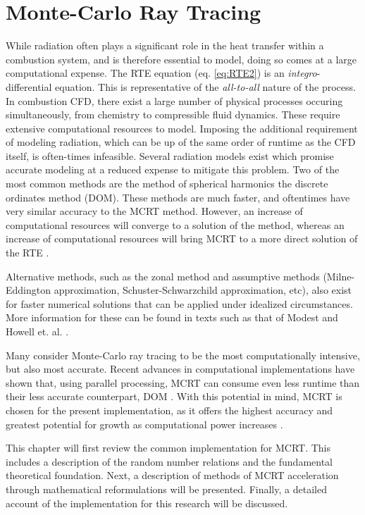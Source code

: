 \addchapheadtotoc
\chapter{Monte-Carlo Ray Tracing}\label{chapter:Modeling}
While radiation often plays a significant role in the heat transfer within a combustion system, and is therefore essential to model, doing so comes at a large computational expense. 
The RTE equation (eq. \ref{eq:RTE2}) is an \textit{integro}-differential equation. This is representative of the \textit{all-to-all} nature of the process. In combustion CFD, there exist a large number of physical processes occuring simultaneously, from chemistry to compressible fluid dynamics. 
These require extensive computational resources to model. Imposing the additional requirement of modeling radiation, which can be up of the same order of runtime as the CFD itself, is often-times infeasible. 
Several radiation models exist which promise accurate modeling at a reduced expense to mitigate this problem. Two of the most common methods are the method of spherical harmonics the discrete ordinates method (DOM).
These methods are much faster, and oftentimes have very similar accuracy to the MCRT method. However, an increase of computational resources will converge to a solution of the method, whereas an increase of computational resources will bring MCRT to a more direct solution of the RTE \cite{Leccese2018ConvectiveChambers}.

Alternative methods, such as the zonal method and assumptive methods (Milne-Eddington approximation, Schuster-Schwarzchild approximation, etc), also exist for faster numerical solutions that can be applied under idealized circumstances.
More information for these can be found in texts such as that of Modest \cite{Modest2013RadiativeTransfer} and Howell et. al. \cite{Howell2010ThermalTransfer}.

Many consider Monte-Carlo ray tracing to be the most computationally intensive, but also most accurate.
Recent advances in computational implementations have shown that, using parallel processing, MCRT can consume even less runtime than their less accurate counterpart, DOM \cite{Humphrey2016RadiativeRefinement}.
With this potential in mind, MCRT is chosen for the present implementation, as it offers the highest accuracy and greatest potential for growth as computational power increases \cite{Liu2020TheFlames,Howell2010ThermalTransfer}.

This chapter will first review the common implementation for MCRT. This includes a description of the random number relations and the fundamental theoretical foundation.
Next, a description of methods of MCRT acceleration through mathematical reformulations will be presented.
Finally, a detailed account of the implementation for this research will be discussed.

